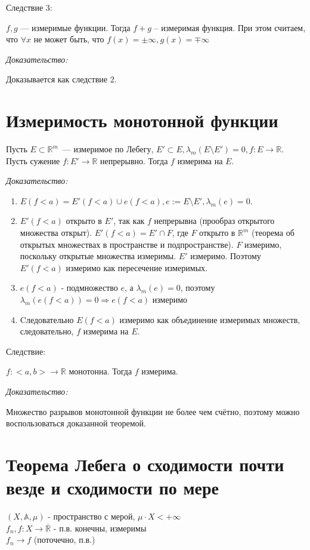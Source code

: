\documentclass[paper=a4, fontsize=17pt]{article}
\begin{document}
Следствие $3$:

$f, g$ --- измеримые функции. Тогда $f + g$ -- измеримая функция. При этом считаем, что $\forall x$ не может быть, что $f(x) = \pm \infty, g(x) = \mp \infty$

\emph{Доказательство:}

Доказывается как следствие $2$.

\section{Измеримость монотонной функции}

Пусть $E \subset \mathds{R}^m$~--- измеримое по Лебегу, $E' \subset E, \lambda_m (E \setminus E') = 0, f: E \rightarrow \mathds{R}.$ Пусть сужение $f: E' \rightarrow \mathds{R}$ непрерывно. Тогда $f$ измерима на $E$.

\emph{Доказательство:}

\begin{enumerate}
	\item $E(f < a) = E'(f < a) \cup e(f < a), e:=E \setminus E', \lambda_m(e) = 0$.
	\item $E'(f < a)$ открыто в $E'$, так как $f$ непрерывна (прообраз открытого множества открыт). $E'(f<a) = E' \cap F$,
        где $F$ открыто в $\mathds{R}^m$ (теорема об открытых множествах в пространстве и подпространстве).
        $F$ измеримо, поскольку открытые множества измеримы. $E'$ измеримо. Поэтому $E'(f<a)$ измеримо как пересечение измеримых.
	\item $e(f < a)$ - подмножество $e$, а $\lambda_m(e) = 0$, поэтому $\lambda_m(e(f < a)) = 0 \Rightarrow e(f < a)$ измеримо
	\item Cледовательно $E(f < a)$ измеримо как объединение измеримых множеств, следовательно, $f$ измерима на $E$.
\end{enumerate}

Следствие:

$f: <a, b> \rightarrow \mathds{R}$ монотонна. Тогда $f$ измерима.

\emph{Доказательство:}

Множество разрывов монотонной функции не более чем счётно, поэтому можно воспользоваться доказанной теоремой.

\section{Теорема Лебега о сходимости почти везде и сходимости по мере}

$(X, \mathds{A}, \mu)$ - пространство с мерой, $\mu \cdot X < +\infty$ \\
$f_n , f : X \rightarrow \overline{\mathds{R}}$ - п.в. конечны, измеримы \\
$f_n \rightarrow f$ (поточечно, п.в.)
\end{document}
